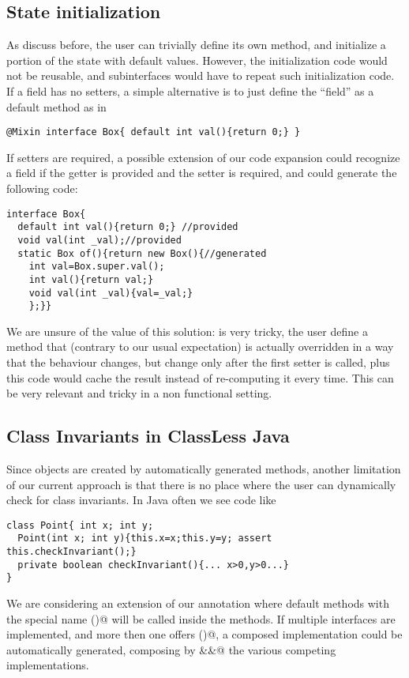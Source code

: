 \subsection{State initialization}
As discuss before, the user can trivially define its own \Q@of@ method, and
initialize a portion of the state with default values.  However, the
initialization code would not be reusable, and subinterfaces would have
to repeat such initialization code.  If a field has no setters, a simple
alternative is to just define the ``field'' as a default method as in
\begin{lstlisting}
@Mixin interface Box{ default int val(){return 0;} }
\end{lstlisting}
If setters are required, a possible extension of our code expansion could
recognize a field if the getter is provided and the setter is required, and
could generate the following code: 
\begin{lstlisting}
interface Box{ 
  default int val(){return 0;} //provided
  void val(int _val);//provided
  static Box of(){return new Box(){//generated
    int val=Box.super.val();
    int val(){return val;}
    void val(int _val){val=_val;}
    };}}
\end{lstlisting}
We are unsure of the value of this solution: is very tricky, the user define a
method that (contrary to our usual expectation) is actually overridden in a way
that the behaviour changes, but change only after the first setter is called,
plus this code would cache the result instead of re-computing it every
time. This can be very relevant and tricky in a non functional setting.

\subsection{Class Invariants in ClassLess Java}
Since objects are created by automatically generated methods, another limitation
of our current approach is that there is no place where the user can dynamically
check for class invariants. In Java often we see code like
\begin{lstlisting}
class Point{ int x; int y;
  Point(int x; int y){this.x=x;this.y=y; assert this.checkInvariant();}
  private boolean checkInvariant(){... x>0,y>0...}
}
\end{lstlisting} 

We are considering an extension of our annotation where 
default methods with the special name \Q@checkInvariant()@ will be called inside the \Q@of@ methods.
If multiple interfaces are implemented, and more then one offers
\Q@checkInvariant()@,  a composed implementation could be automatically generated, composing by \Q@&&@ the various competing implementations.

